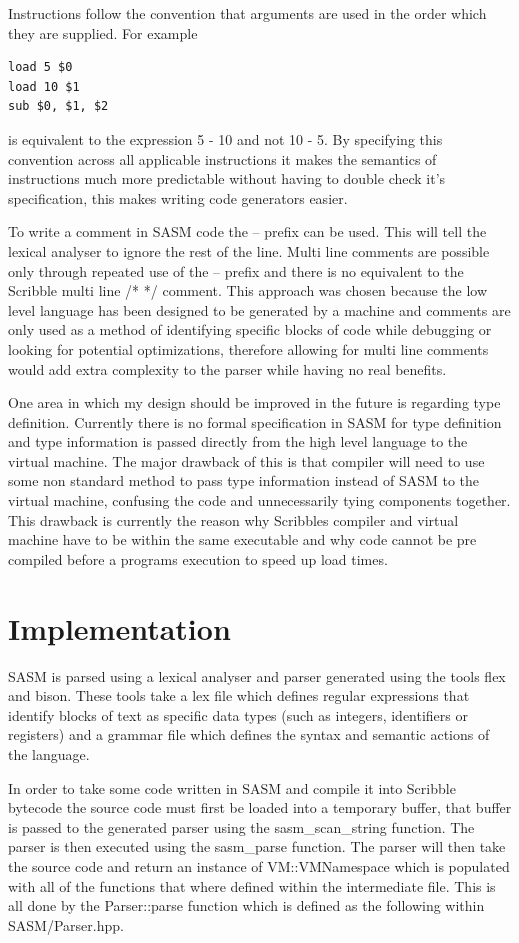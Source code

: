 \documentclass[]{final_report}
\begin{document}
Instructions follow the convention that arguments are used in the order which they are supplied. For example
\begin{verbatim}load 5 $0
load 10 $1
sub $0, $1, $2
\end{verbatim}
is equivalent to the expression 5 - 10 and not 10 - 5. By specifying this convention across all applicable instructions it makes the semantics of instructions much more predictable without having to double check it's specification, this makes writing code generators easier.

To write a comment in SASM code the -- prefix can be used. This will tell the lexical analyser to ignore the rest of the line. Multi line comments are possible only through repeated use of the -- prefix and there is no equivalent to the Scribble multi line /* */ comment. This approach was chosen because the low level language has been designed to be generated by a machine and comments are only used as a method of identifying specific blocks of code while debugging or looking for potential optimizations, therefore allowing for multi line comments would add extra complexity to the parser while having no real benefits.

One area in which my design should be improved in the future is regarding type definition. Currently there is no formal specification in SASM for type definition and type information is passed directly from the high level language to the virtual machine. The major drawback of this is that compiler will need to use some non standard method to pass type information instead of SASM to the virtual machine, confusing the code and unnecessarily tying components together. This drawback is currently the reason why Scribbles compiler and virtual machine have to be within the same executable and why code cannot be pre compiled before a programs execution to speed up load times.

\section{Implementation}

SASM is parsed using a lexical analyser and parser generated using the tools flex and bison. These tools take a lex file which defines regular expressions that identify blocks of text as specific data types (such as integers, identifiers or registers) and a grammar file which defines the syntax and semantic actions of the language.

In order to take some code written in SASM and compile it into Scribble bytecode the source code must first be loaded into a temporary buffer, that buffer is passed to the generated parser using the sasm\_scan\_string function. The parser is then executed using the sasm\_parse function. The parser will then take the source code and return an instance of VM::VMNamespace which is populated with all of the functions that where defined within the intermediate file. This is all done by the Parser::parse function which is defined as the following within SASM/Parser.hpp.
\end{document}

